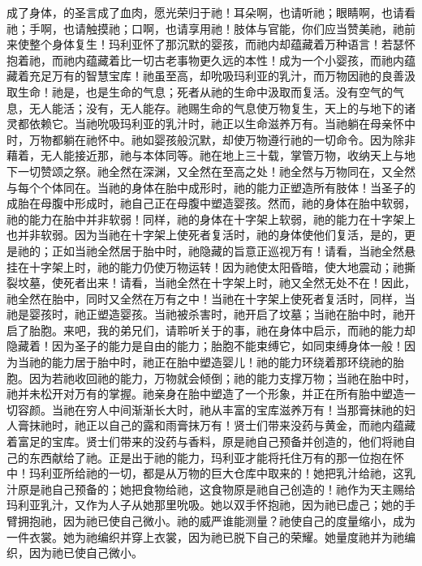 成了身体，的圣言成了血肉，愿光荣归于祂！耳朵啊，也请听祂；眼睛啊，也请看祂；手啊，也请触摸祂；口啊，也请享用祂！肢体与官能，你们应当赞美祂，祂前来使整个身体复生！玛利亚怀了那沉默的婴孩，而祂内却蕴藏着万种语言！若瑟怀抱着祂，而祂内蕴藏着比一切古老事物更久远的本性！成为一个小婴孩，而祂内蕴藏着充足万有的智慧宝库！祂虽至高，却吮吸玛利亚的乳汁，而万物因祂的良善汲取生命！祂是，也是生命的气息；死者从祂的生命中汲取而复活。没有空气的气息，无人能活；没有，无人能存。祂赐生命的气息使万物复生，天上的与地下的诸灵都依赖它。当祂吮吸玛利亚的乳汁时，祂正以生命滋养万有。当祂躺在母亲怀中时，万物都躺在祂怀中。祂如婴孩般沉默，却使万物遵行祂的一切命令。因为除非藉着，无人能接近那，祂与本体同等。祂在地上三十载，掌管万物，收纳天上与地下一切赞颂之祭。祂全然在深渊，又全然在至高之处！祂全然与万物同在，又全然与每个个体同在。当祂的身体在胎中成形时，祂的能力正塑造所有肢体！当圣子的成胎在母腹中形成时，祂自己正在母腹中塑造婴孩。然而，祂的身体在胎中软弱，祂的能力在胎中并非软弱！同样，祂的身体在十字架上软弱，祂的能力在十字架上也并非软弱。因为当祂在十字架上使死者复活时，祂的身体使他们复活，是的，更是祂的；正如当祂全然居于胎中时，祂隐藏的旨意正巡视万有！请看，当祂全然悬挂在十字架上时，祂的能力仍使万物运转！因为祂使太阳昏暗，使大地震动；祂撕裂坟墓，使死者出来！请看，当祂全然在十字架上时，祂又全然无处不在！因此，祂全然在胎中，同时又全然在万有之中！当祂在十字架上使死者复活时，同样，当祂是婴孩时，祂正塑造婴孩。当祂被杀害时，祂开启了坟墓；当祂在胎中时，祂开启了胎胞。来吧，我的弟兄们，请聆听关于的事，祂在身体中启示，而祂的能力却隐藏着！因为圣子的能力是自由的能力；胎胞不能束缚它，如同束缚身体一般！因为当祂的能力居于胎中时，祂正在胎中塑造婴儿！祂的能力环绕着那环绕祂的胎胞。因为若祂收回祂的能力，万物就会倾倒；祂的能力支撑万物；当祂在胎中时，祂并未松开对万有的掌握。祂亲身在胎中塑造了一个形象，并正在所有胎中塑造一切容颜。当祂在穷人中间渐渐长大时，祂从丰富的宝库滋养万有！当那膏抹祂的妇人膏抹祂时，祂正以自己的露和雨膏抹万有！贤士们带来没药与黄金，而祂内蕴藏着富足的宝库。贤士们带来的没药与香料，原是祂自己预备并创造的，他们将祂自己的东西献给了祂。正是出于祂的能力，玛利亚才能将托住万有的那一位抱在怀中！玛利亚所给祂的一切，都是从万物的巨大仓库中取来的！她把乳汁给祂，这乳汁原是祂自己预备的；她把食物给祂，这食物原是祂自己创造的！祂作为天主赐给玛利亚乳汁，又作为人子从她那里吮吸。她以双手怀抱祂，因为祂已虚己；她的手臂拥抱祂，因为祂已使自己微小。祂的威严谁能测量？祂使自己的度量缩小，成为一件衣裳。她为祂编织并穿上衣裳，因为祂已脱下自己的荣耀。她量度祂并为祂编织，因为祂已使自己微小。\par

